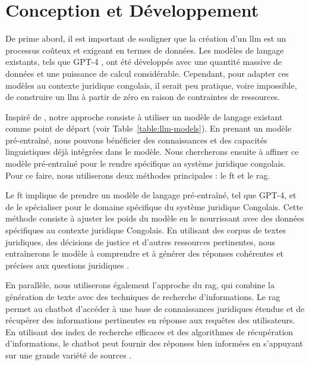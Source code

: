 
\chapter{Conception et Développement} %

\label{ch:2} %

De prime abord, il est important de souligner que la création d'un \ac{llm} est un processus coûteux et exigeant en termes de données. Les modèles de langage existants, tels que GPT-4 \cite{openai2023gpt4}, ont été développés avec une quantité massive de données et une puissance de calcul considérable. Cependant, pour adapter ces modèles au contexte juridique congolais, il serait peu pratique, voire impossible, de construire un \ac{llm} à partir de zéro en raison de contraintes de ressources.

Inspiré de \cite{soudani2024fine}, notre approche consiste à utiliser un modèle de langage existant comme point de départ (voir Table~\ref{table:llm-models}). En prenant un modèle pré-entraîné, nous pouvons bénéficier des connaissances et des capacités linguistiques déjà intégrées dans le modèle. Nous chercherons ensuite à affiner ce modèle pré-entraîné pour le rendre spécifique au système juridique congolais. Pour ce faire, nous utiliserons deux méthodes principales : le \ac{ft} et le \ac{rag}.

Le \ac{ft} implique de prendre un modèle de langage pré-entraîné, tel que GPT-4, et de le spécialiser pour le domaine spécifique du système juridique Congolais. Cette méthode consiste à ajuster les poids du modèle en le nourrissant avec des données spécifiques au contexte juridique Congolais. En utilisant des corpus de textes juridiques, des décisions de justice et d'autres ressources pertinentes, nous entraînerons le modèle à comprendre et à générer des réponses cohérentes et précises aux questions juridiques \cite{yue2023disclawllm}.

En parallèle, nous utiliserons également l'approche du \ac{rag}, qui combine la génération de texte avec des techniques de recherche d'informations. Le \ac{rag} permet au chatbot d'accéder à une base de connaissances juridiques étendue et de récupérer des informations pertinentes en réponse aux requêtes des utilisateurs. En utilisant des index de recherche efficaces et des algorithmes de récupération d'informations, le chatbot peut fournir des réponses bien informées en s'appuyant sur une grande variété de sources \cite{lewis2021retrievalaugmented}.

